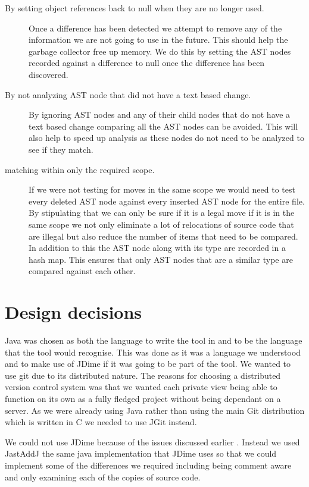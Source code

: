 \begin{description}
 \item [By setting object references back to null when they are no longer used.]
  Once a difference has been detected we attempt to remove any of the information we are not going to use in the future.  This should help the garbage collector free up memory. We do this by setting the AST nodes recorded against a difference to null once the difference has been discovered. 
\item [By not analyzing AST node that did not have a text based change.] 
  By ignoring AST nodes and any of their child nodes that do not have a text based change comparing all the AST nodes can be avoided.  This will also help to speed up analysis as these nodes do not need to be analyzed to see if they match.
\item [matching within only the required scope.]
  If we were not testing for moves in the same scope we would need to test every deleted AST node against every inserted AST node for the entire file. By stipulating that we can only be sure if it is a legal move if it is in the same scope we not only eliminate a lot of relocations of source code that are illegal but also reduce the number of items that need to be compared. In addition to this the AST node along with its type are recorded in a hash map.  This ensures that only AST nodes that are a similar type are compared against each other.
\end{description}


\section{Design decisions}
Java was chosen as both the language to write the tool in and to be the language that the tool would recognise.  This was done as it was a language we understood and to make use of JDime if it was going to be part of the tool.  We wanted to use git due to its distributed nature.  The reasons for choosing a distributed version control system was that we wanted each private view being able to function on its own as a fully fledged project without being dependant on a server.  As we were already using Java rather than using the main Git distribution which is written in C we needed to use JGit instead.    

We could not use JDime because of the issues discussed earlier . Instead we used JastAddJ the same java implementation that JDime uses so that we could implement some of the differences we required including being comment aware and only examining each of the copies of source code.

